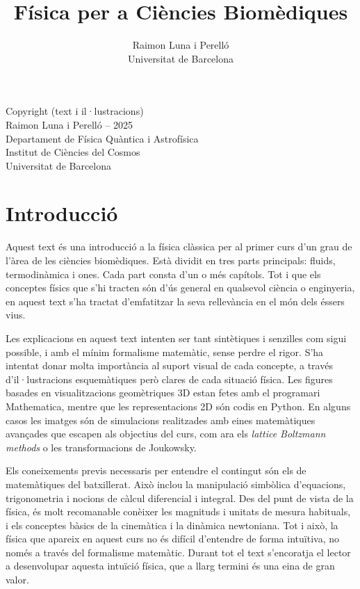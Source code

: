 \documentclass[12pt]{book}
\title{Física per a Ciències Biomèdiques}
\author{Raimon Luna i Perelló \\ Universitat de Barcelona}
\begin{document}
\maketitle

\null\vfill
\noindent
Copyright (text i il·lustracions)\\
Raimon Luna i Perelló -- 2025 \\
Departament de Física Quàntica i Astrofísica\\
Institut de Ciències del Cosmos\\
Universitat de Barcelona
\newpage

\tableofcontents

\chapter*{Introducció}

Aquest text és una introducció a la física clàssica per al primer curs d'un grau de l'àrea de les ciències biomèdiques. Està dividit en tres parts principals: fluids, termodinàmica i ones. Cada part consta d'un o més capítols. Tot i que els conceptes físics que s'hi tracten són d'ús general en qualsevol ciència o enginyeria, en aquest text s'ha tractat d'emfatitzar la seva rellevància en el món dels éssers vius.

Les explicacions en aquest text intenten ser tant sintètiques i senzilles com sigui possible, i amb el mínim formalisme matemàtic, sense perdre el rigor. S'ha intentat donar molta importància al suport visual de cada concepte, a través d'il·lustracions esquemàtiques però clares de cada situació física. Les figures basades en visualitzacions geomètriques 3D estan fetes amb el programari Mathematica, mentre que les representacions 2D són codis en Python. En alguns casos les imatges són de simulacions realitzades amb eines matemàtiques avançades que escapen als objectius del curs, com ara els {\it lattice Boltzmann methods} o les transformacions de Joukowsky.

Els coneixements previs necessaris per entendre el contingut són els de matemàtiques del batxillerat. Això inclou la manipulació simbòlica d'equacions, trigonometria i nocions de càlcul diferencial i integral. Des del punt de vista de la física, és molt recomanable conèixer les magnituds i unitats de mesura habituals, i els conceptes bàsics de la cinemàtica i la dinàmica newtoniana. Tot i això, la física que apareix en aquest curs no és difícil d'entendre de forma intuïtiva, no només a través del formalisme matemàtic. Durant tot el text s'encoratja el lector a desenvolupar aquesta intuïció física, que a llarg termini és una eina de gran valor.
\end{document}
